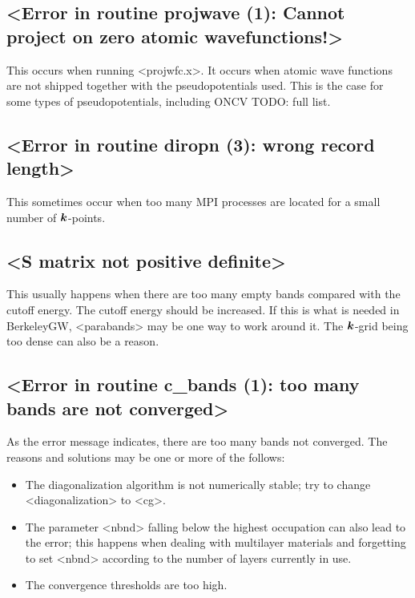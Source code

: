 \documentclass[hyperref, a4paper, 12pt]{report}
\def\texttt#1{<#1>}%
\newcommand{\shortcode}[1]{\texttt{#1}}
\begin{document}
\subsection{\shortcode{Error in routine projwave (1): Cannot project on zero atomic wavefunctions!}}

This occurs when running \shortcode{projwfc.x}. 
It occurs when atomic wave functions are not 
shipped together with the pseudopotentials used. 
This is the case for some types of pseudopotentials, 
including ONCV TODO: full list.

\subsection{\shortcode{Error in routine diropn (3): wrong record length}}

This sometimes occur when too many MPI processes are located 
for a small number of $\vb*{k}$-points.

\subsection{\shortcode{S matrix not positive definite}}

This usually happens when there are too many empty bands
compared with the cutoff energy.
The cutoff energy should be increased.
If this is what is needed in BerkeleyGW, 
\shortcode{parabands} may be one way to work around it.
The $\vb*{k}$-grid being too dense can also be a reason.

\subsection{\shortcode{Error in routine c_bands (1): too many bands are not converged}}

As the error message indicates, there are too many bands not converged.
The reasons and solutions may be one or more of the follows:
\begin{itemize}
    \item The diagonalization algorithm is not numerically stable;
        try to change \shortcode{diagonalization} to \shortcode{cg}.
    \item The parameter \shortcode{nbnd} 
        falling below the highest occupation can also lead to the error; 
        this happens when dealing with multilayer materials 
        and forgetting to set \shortcode{nbnd} 
        according to the number of layers currently in use.
    \item The convergence thresholds are too high.
\end{itemize}
\end{document}
